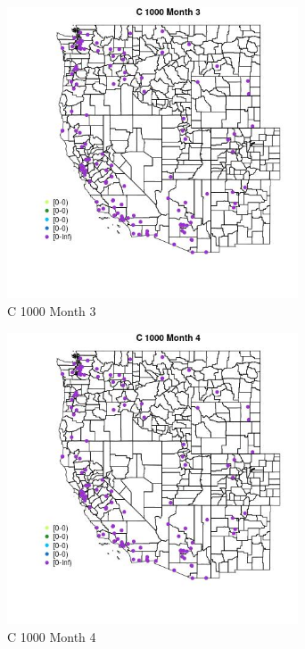 \begin{figure} 
\centering  
\includegraphics[width=0.77\textwidth]{Code_Outputs/Report_ML_input_PM25_Step4_part_e_de_duplicated_aves_MapObsMo3C_1000.jpg} 
\caption{\label{fig:Report_ML_input_PM25_Step4_part_e_de_duplicated_avesMapObsMo3C_1000}C 1000 Month 3} 
\end{figure} 
 

\begin{figure} 
\centering  
\includegraphics[width=0.77\textwidth]{Code_Outputs/Report_ML_input_PM25_Step4_part_e_de_duplicated_aves_MapObsMo4C_1000.jpg} 
\caption{\label{fig:Report_ML_input_PM25_Step4_part_e_de_duplicated_avesMapObsMo4C_1000}C 1000 Month 4} 
\end{figure} 
 


